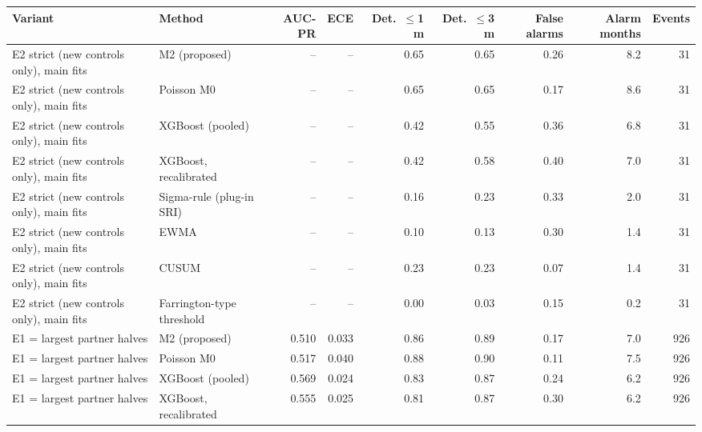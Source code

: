\noindent\begin{minipage}{\linewidth}
\label{tab:S28}
\centering\tiny
\begin{tabular}{llrrrrrrr}
\toprule
Variant & Method & AUC-PR & ECE & Det.\ $\leq$1 m & Det.\ $\leq$3 m & False alarms & Alarm months & Events \\ \midrule
E2 strict (new controls only), main fits & M2 (proposed) & -- & -- & 0.65 & 0.65 & 0.26 & 8.2 & 31 \\
E2 strict (new controls only), main fits & Poisson M0 & -- & -- & 0.65 & 0.65 & 0.17 & 8.6 & 31 \\
E2 strict (new controls only), main fits & XGBoost (pooled) & -- & -- & 0.42 & 0.55 & 0.36 & 6.8 & 31 \\
E2 strict (new controls only), main fits & XGBoost, recalibrated & -- & -- & 0.42 & 0.58 & 0.40 & 7.0 & 31 \\
E2 strict (new controls only), main fits & Sigma-rule (plug-in SRI) & -- & -- & 0.16 & 0.23 & 0.33 & 2.0 & 31 \\
E2 strict (new controls only), main fits & EWMA & -- & -- & 0.10 & 0.13 & 0.30 & 1.4 & 31 \\
E2 strict (new controls only), main fits & CUSUM & -- & -- & 0.23 & 0.23 & 0.07 & 1.4 & 31 \\
E2 strict (new controls only), main fits & Farrington-type threshold & -- & -- & 0.00 & 0.03 & 0.15 & 0.2 & 31 \\
E1 = largest partner halves & M2 (proposed) & 0.510 & 0.033 & 0.86 & 0.89 & 0.17 & 7.0 & 926 \\
E1 = largest partner halves & Poisson M0 & 0.517 & 0.040 & 0.88 & 0.90 & 0.11 & 7.5 & 926 \\
E1 = largest partner halves & XGBoost (pooled) & 0.569 & 0.024 & 0.83 & 0.87 & 0.24 & 6.2 & 926 \\
E1 = largest partner halves & XGBoost, recalibrated & 0.555 & 0.025 & 0.81 & 0.87 & 0.30 & 6.2 & 926 \\

\end{tabular}
\end{minipage}
